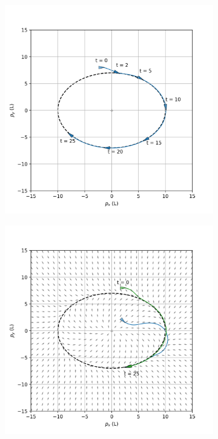 \begin{figure}[h!]
    \centering
    \begin{subfigure}[b]{0.49\textwidth}
         \centering
         \includegraphics[trim={0 0cm 0 -1cm}, clip, width=\textwidth]{fig/GVF_CBF_intro2.png}
         \caption{}
         \label{fig: gvf_cbf_intro_0}
     \end{subfigure}
     \begin{subfigure}[b]{0.49\textwidth}
         \centering
         \includegraphics[trim={0 0cm 0 -1cm}, clip, width=\textwidth]{fig/GVF_CBF_intro1.png}
         \caption{}
         \label{fig: gvf_cbf_intro_1}
     \end{subfigure}
     

\end{figure}
